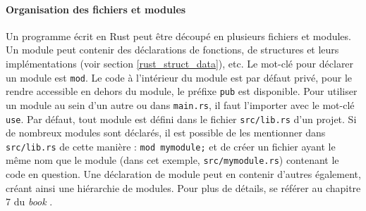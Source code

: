 \paragraph{Organisation des fichiers et modules}
Un programme écrit en Rust peut être découpé en plusieurs fichiers et modules. 
Un module peut contenir des déclarations de fonctions, de structures et leurs implémentations (voir 
section \ref{rust_struct_data}), etc. Le mot-clé pour déclarer un module est \texttt{mod}. 
Le code à l'intérieur du module est par défaut privé, pour le rendre accessible en dehors du module, 
le préfixe \texttt{pub} est disponible. Pour utiliser un module au sein d'un autre ou dans 
\texttt{main.rs}, il faut l'importer avec le mot-clé \texttt{use}. Par défaut, 
tout module est défini dans le fichier \texttt{src/lib.rs} d'un projet. Si de nombreux 
modules sont déclarés, il est possible de les mentionner dans \texttt{src/lib.rs} de cette 
manière : \texttt{mod mymodule;} et de créer un fichier ayant le même nom que le module 
(dans cet exemple, \texttt{src/mymodule.rs}) contenant le code en question. Une déclaration 
de module peut en contenir d'autres également, créant ainsi une hiérarchie de modules.
Pour plus de détails, se référer au chapitre 7 du \textit{book} \cite{ref0}.

